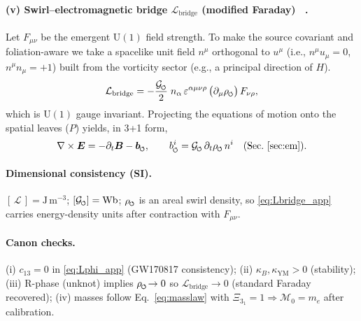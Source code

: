 \documentclass[10pt,reprint,aps,onecolumn,nofootinbib]{revtex4-2}
\newcommand{\vect}[1]{\boldsymbol{#1}} %
\newcommand{\EE}{\vect{E}}
\newcommand{\BB}{\vect{B}}
\begin{document}
\paragraph*{(v) Swirl–electromagnetic bridge \(\mathcal{L}_{\mathrm{bridge}}\) (modified Faraday)~ \cite{EM_G}.}
    Let \(F_{\mu\nu}\) be the emergent \(\mathrm{U}(1)\) field strength.
    To make the source covariant and foliation-aware we take a spacelike unit field \(n^\mu\) orthogonal to \(u^\mu\) (i.e., \(n^\mu u_\mu=0\), \(n^\mu n_\mu=+1\)) built from the vorticity sector (e.g., a principal direction of \(H\)).
    \begin{equation}
    \mathcal{L}_{\mathrm{bridge}}
    =-\frac{\mathcal{G}_{\mkern-2mu\scriptscriptstyle\boldsymbol{\circlearrowleft}}}{2}\;
    n_\alpha\,\varepsilon^{\alpha\mu\nu\rho}\,
    \big(\partial_\mu \rho_{\mkern-2mu\scriptscriptstyle\boldsymbol{\circlearrowleft}}\big)\,F_{\nu\rho},
    \label{eq:Lbridge_app}
    \end{equation}
    which is \(\mathrm{U}(1)\) gauge invariant.
    Projecting the equations of motion onto the spatial leaves (\(P\)) yields, in 3+1 form,
    \[
        \nabla\times\EE=-\partial_t\BB-\vect{b}_{\mkern-2mu\scriptscriptstyle\boldsymbol{\circlearrowleft}},
        \qquad
        b^i_{\mkern-2mu\scriptscriptstyle\boldsymbol{\circlearrowleft}}
        =\mathcal{G}_{\mkern-2mu\scriptscriptstyle\boldsymbol{\circlearrowleft}}\,
        \partial_t\rho_{\mkern-2mu\scriptscriptstyle\boldsymbol{\circlearrowleft}}\,
        n^i
        \quad\text{(Sec.~\ref{sec:em})}.
    \]

\paragraph*{Dimensional consistency (SI).}
    \([\,\mathcal{L}\,]=\mathrm{J\,m^{-3}}\);
    \([\mathcal{G}_{\mkern-2mu\scriptscriptstyle\boldsymbol{\circlearrowleft}}]=\mathrm{Wb}\);
    \(\rho_{\mkern-2mu\scriptscriptstyle\boldsymbol{\circlearrowleft}}\) is an areal swirl density, so
    \eqref{eq:Lbridge_app} carries energy-density units after contraction with \(F_{\mu\nu}\).

\paragraph*{Canon checks.}
(i) \(c_{13}=0\) in \eqref{eq:Lphi_app} (GW170817 consistency);
    (ii) \(\kappa_B,\kappa_{\mathrm{YM}}>0\) (stability);
    (iii) R-phase (unknot) implies \(\rho_{\mkern-2mu\scriptscriptstyle\boldsymbol{\circlearrowleft}}\!\to 0\) so \(\mathcal{L}_{\mathrm{bridge}}\!\to 0\) (standard Faraday recovered);
    (iv) masses follow Eq.~\ref{eq:masslaw} with \(\Xi_{3_1}=1\Rightarrow \mathcal{M}_0=m_e\) after calibration.
\end{document}
